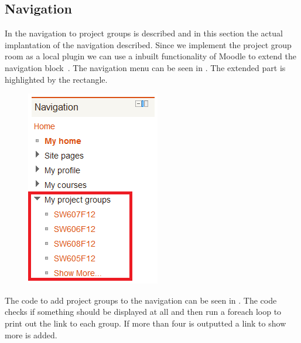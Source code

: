 	
	






\subsection{Navigation}
In  the navigation to project groups is described and in this section the actual implantation of the navigation described. 
Since we implement the project group room as a local plugin we can use a inbuilt functionality of Moodle to extend the navigation block~\cite{moodleextendnavigationblock}.
The navigation menu can be seen in . The extended part is highlighted by the rectangle. 

\begin{figure}
	\centering
		\includegraphics[scale=0.7]{images/moodlenavigationblock.png}
	\label{fig:moodlenavigationblock}
\end{figure}
The code to add project groups to the navigation can be seen in . The code checks if something should be displayed at all and then run a foreach loop to print out the link to each group. 
If more than four is outputted a link to show more is added. 


